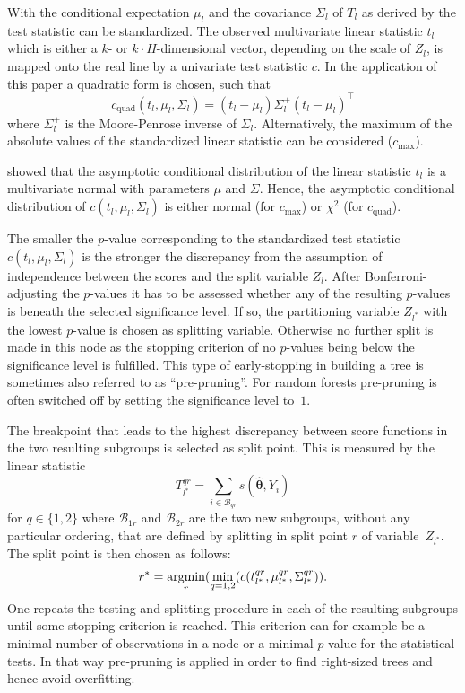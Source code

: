 \documentclass[aoas, preprint]{imsart}
\newcommand{\argmin}{\operatorname{argmin}\displaylimits}
\numberwithin{equation}{subsection}
\begin{document}
\begin{appendix}
With the conditional expectation $\mu_l$ and the covariance 
$\Sigma_l$ of $T_l$ as derived by 
\cite{Strasser+Weber:1999} the test statistic can be standardized. 
The observed multivariate linear statistic $t_l$ which is either a
$k$- or $k \cdot H$-dimensional vector, depending on the scale of $Z_l$,
is mapped onto the real line by a univariate test statistic $c$.
In the application of this paper a quadratic form is chosen, such that
\begin{equation}
c_{\text{quad}}(t_l,\mu_l,\Sigma_l) = (t_l-\mu_l)\Sigma_l^+(t_l-\mu_l)^{\top}
\end{equation}
where $\Sigma_l^+$ is the Moore-Penrose inverse of $\Sigma_l$. Alternatively,
the maximum of the absolute values of the standardized linear statistic
can be considered ($c_{\text{max}}$).

\cite{Strasser+Weber:1999} showed that the asymptotic conditional 
distribution of the linear statistic $t_l$ is a multivariate normal with parameters
$\mu$ and $\Sigma$. Hence, the asymptotic conditional distribution of
$c(t_{l},\mu_{l},\Sigma_{l})$ 
is either normal
(for $c_{\text{max}}$) 
or 
$\chi^2$ (for $c_{\text{quad}}$).

The smaller the $p$-value corresponding to the standardized test 
statistic $c(t_{l},\mu_{l},\Sigma_{l})$ is the stronger the discrepancy 
from the assumption of independence between the scores and the split 
variable $Z_l$.
%
After Bonferroni-adjusting the $p$-values it has to be assessed whether
any of the resulting $p$-values is beneath the selected significance level. 
If so, the partitioning variable $Z_{l^\ast}$ with the lowest $p$-value 
is chosen as splitting variable. Otherwise no further split is made 
in this node as the stopping criterion of no $p$-values being below the 
significance level is fulfilled. This type of early-stopping in building
a tree is sometimes also referred to as ``pre-pruning''. For random forests
pre-pruning is often switched off by setting the significance level to~$1$.

The breakpoint that leads to the highest discrepancy between score functions 
in the two resulting subgroups is selected as split point. 
This is measured by the linear statistic
\begin{equation}
T_{l^{\ast}}^{qr} = \sum_{i \in \mathcal{B}_{qr}} s(\bm{\hat{\theta}}, Y_i)
\end{equation}
for $q \in \{1,2\}$ where $\mathcal{B}_{1r}$ and $\mathcal{B}_{2r}$ are the 
two new subgroups, without any particular ordering, that are defined by 
splitting in split point $r$ of variable~$Z_{l^{\ast}}$.
The split point is then chosen as follows:
\begin{equation}
r^{\ast} = \argmin_{r} (\min_{q=1,2}(c(t_{l^{\ast}}^{qr},\mu_{l^{\ast}}^{qr},\Sigma_{l^{\ast}}^{qr})).
\end{equation}
One repeats the testing and splitting procedure in each of the resulting 
subgroups until some stopping criterion is reached. This criterion 
can for example be a minimal number of observations in a node or a 
minimal $p$-value for the statistical tests. In that way pre-pruning
is applied in order to find right-sized trees and hence 
avoid overfitting.


\end{appendix}
\end{document}
